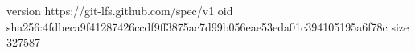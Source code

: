 version https://git-lfs.github.com/spec/v1
oid sha256:4fdbeca9f41287426ccdf9ff3875ac7d99b056eae53eda01c394105195a6f78c
size 327587
